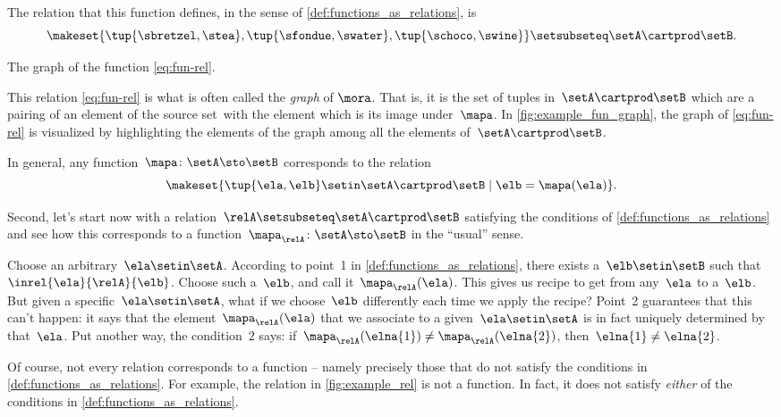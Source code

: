 The relation that this function defines, in the sense of \cref{def:functions_as_relations}, is
%
\begin{equation}
    \label{eq:fun-rel}
    \makeset{ \tup{\sbretzel, \stea}, \tup{\sfondue, \swater}, \tup{\schoco, \swine} } \setsubseteq \setA \cartprod \setB.
\end{equation}

\begin{marginfigure}
    \centering
    \caption{The graph of the function \cref{eq:fun-rel}.}
    \label{fig:example_fun_graph}
\end{marginfigure}

This relation \cref{eq:fun-rel} is what is often called the \emph{graph} of $\mora$.
That is, it is the set of tuples in~$\setA \cartprod \setB$ which are a pairing of an element of the source set~\setA with the element which is its image under~$\mapa$.
In \cref{fig:example_fun_graph}, the graph of \cref{eq:fun-rel} is visualized by highlighting the elements of the graph among all the elements of~$\setA \cartprod \setB$.

In general, any function~$\mapa \colon \setA \sto \setB$ corresponds to the relation
\begin{equation}
    \makeset{ \tup{\ela,\elb} \setin \setA \cartprod \setB \mid \elb= \mapa(\ela) }.
\end{equation}

Second, let's start now with a relation~$\relA \setsubseteq \setA \cartprod \setB$ satisfying the conditions of \cref{def:functions_as_relations} and see how this corresponds to a function~$\mapa_\relA \colon \setA \sto \setB$ in the ``usual'' sense.

Choose an arbitrary~$\ela \setin \setA$.
According to point~1 in \cref{def:functions_as_relations}, there exists a~$\elb \setin \setB$ such that~$\inrel{\ela}{\relA}{\elb}$.
Choose such a~$\elb$, and call it~$\mapa_\relA(\ela)$.
This gives us recipe to get from any~$\ela$ to a~$\elb$.
But given a specific~$\ela \setin \setA$, what if we choose~$\elb$ differently each time we apply the recipe?
Point~2 guarantees that this can't happen: it says that the element~$\mapa_\relA(\ela)$ that we associate to a given~$\ela \setin \setA$ is in fact uniquely determined by that~$\ela$.
Put another way, the condition~$2$ says: if~$\mapa_\relA(\elna{1}) \neq \mapa_\relA(\elna{2})$, then~$\elna{1} \neq\elna{2}$.

\begin{remark}
    Of course, not every relation corresponds to a function -- namely precisely those that do not satisfy the conditions in \cref{def:functions_as_relations}.
    For example, the relation in \cref{fig:example_rel} is not a function.
    In fact, it does not satisfy \emph{either} of the conditions in \cref{def:functions_as_relations}.
\end{remark}

